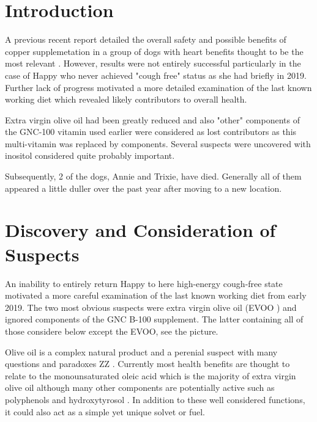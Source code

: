 
\begin{abstract}


\end{abstract}

\maketitle
\tableofcontents
\newpage


\section{Introduction  }

A previous recent report detailed the overall safety and
possible benefits of copper supplemetation in a group of dogs
with heart benefits thought to be the most relevant
\cite{marchywka-MJM-2024-010-0.01rg} .
However, results were not entirely successful particularly in the
case of Happy who never achieved "cough free" status as
she had briefly in 2019. Further lack of progress
motivated a more detailed
examination of the last known working diet which revealed
likely contributors to overall health. 


Extra virgin olive oil
had been greatly reduced and also "other" components of the
GNC-100 vitamin used earlier were considered as lost contributors
as this multi-vitamin was replaced by components. Several suspects
were uncovered with inositol considered quite probably important.  

Subsequently, 2 of the dogs, Annie and Trixie,  have died.
Generally all of them appeared a little duller over the past year
after moving to a new location.

\section{ Discovery and Consideration of Suspects }

An inability to entirely return Happy to here high-energy cough-free
state motivated a more careful examination of the last known working
diet from early 2019. The two most obvious suspects were extra
virgin olive oil (EVOO ) and ignored components of the GNC B-100
supplement. The latter containing all of those considere below except
the EVOO, see the picture.  


Olive oil is a complex natural product and a perenial suspect 
with many questions and paradoxes
\cite{10.1016/S0008-6363(01)00545-4}ZZ
. Currently most health benefits are thought to relate to
the monounsaturated oleic acid which is the majority 
of extra virgin olive oil although many other components
are potentially active such as polyphenols and
hydroxytyrosol  \cite{LU2024529}
\cite{Milena_Maurizio_Exploring_Cardiovascular_Benefits_2025}
.
In addition to these well considered functions, it could also act
as a simple yet unique solvet or fuel. 

